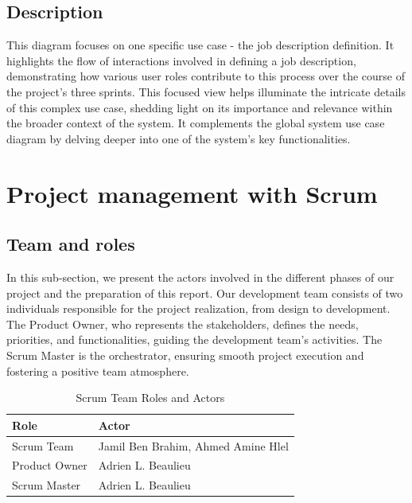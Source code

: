 \subsection*{Description}
This diagram focuses on one specific use case - the job description definition. It highlights the flow of interactions involved in defining a job description, demonstrating how various user roles contribute to this process over the course of the project's three sprints. This focused view helps illuminate the intricate details of this complex use case, shedding light on its importance and relevance within the broader context of the system. It complements the global system use case diagram by delving deeper into one of the system's key functionalities.

\section{Project management with Scrum}
\subsection{Team and roles}
In this sub-section, we present the actors involved in the different phases of our project and the preparation of this report. Our development team consists of two individuals responsible for the project realization, from design to development. The Product Owner, who represents the stakeholders, defines the needs, priorities, and functionalities, guiding the development team's activities. The Scrum Master is the orchestrator, ensuring smooth project execution and fostering a positive team atmosphere.

\begin{table}[H]
    \renewcommand{\arraystretch}{1.5}%
    \caption{Scrum Team Roles and Actors}
    \centering
    \medskip
    \begin{tabularx}{\textwidth} {
            | >{\hsize=0.5\hsize\raggedright\arraybackslash}X
            | >{\hsize=1.5\hsize\raggedright\arraybackslash}X |}
        \hline
        \rowcolor{primary} \textbf {Role} & \textbf {Actor} \\
        \hline
        Scrum Team & Jamil Ben Brahim, Ahmed Amine Hlel \\
        \hline
        Product Owner & Adrien L. Beaulieu \\
        \hline
        Scrum Master & Adrien L. Beaulieu \\
        \hline
    \end{tabularx}
\end{table}

